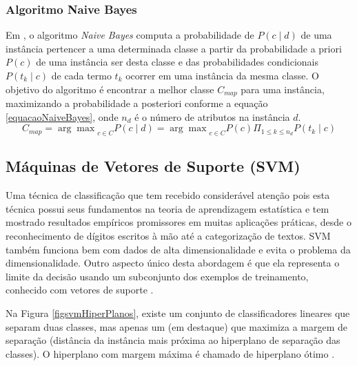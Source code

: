 \documentclass[
	12pt,				%
	openright,			%
	oneside,	
	a4paper,				%
	english,				%
	brazil				%
]{abntex2/abntex2} %
\begin{document}
	\subsubsection{Algoritmo Naive Bayes}
	
	
	Em \cite{lucca:2013}, o algoritmo \textit{Naive Bayes} computa a probabilidade de $P(c \mid d)$ de uma instância pertencer a uma determinada classe a partir da probabilidade a priori $P(c)$ de uma instância ser desta classe e das probabilidades condicionais $P(t_k \mid c)$ de cada termo $t_k$ ocorrer em uma instância da mesma classe. O objetivo do algoritmo é encontrar a melhor classe $C_{map}$ para uma instância, maximizando a probabilidade a posteriori conforme a equação \ref{equacaoNaiveBayes}, onde $n_d$ é o número de atributos na instância $d$.
	\\
	
	\begin{equation}
	\label{equacaoNaiveBayes}
	C_{map} = {\arg \max}_{c \in C}P(c \mid d) = {\arg \max}_{c \in C}P(c) \Pi_{1 \leq k \leq n_d} P(t_k \mid c)
	\end{equation}
	
	
	
	\subsection{Máquinas de Vetores de Suporte (SVM)}
	
	Uma técnica de classificação que tem recebido considerável atenção pois esta técnica possui seus fundamentos na teoria de aprendizagem estatística e tem mostrado resultados empíricos promissores em muitas aplicações práticas, desde o reconhecimento de dígitos escritos à mão até a categorização de textos. SVM também funciona bem com dados de alta dimensionalidade e evita o problema da dimensionalidade. Outro aspecto único desta abordagem é que ela representa o limite da decisão usando um subconjunto dos exemplos de treinamento, conhecido com vetores de suporte \cite{tan:2009}.
	
	Na Figura \ref{figsvmHiperPlanos}, existe um conjunto de classificadores lineares que separam duas classes, mas apenas um (em destaque) que maximiza a margem de separação (distância da instância mais próxima ao hiperplano de separação das classes). O hiperplano com margem máxima é chamado de hiperplano ótimo \cite{junior:2010}.
\end{document}
